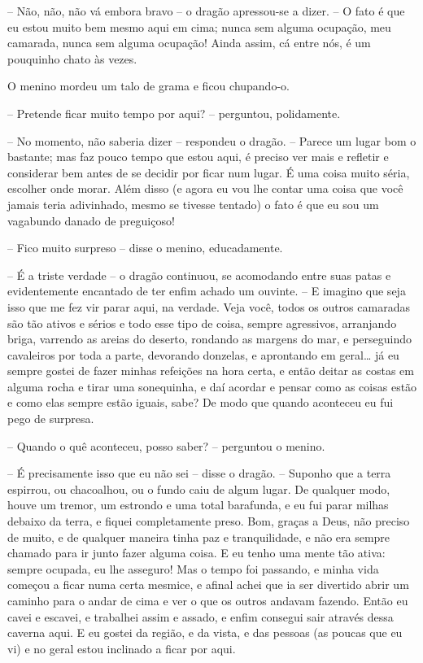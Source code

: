 -- Não, não, não vá embora bravo -- o dragão apressou-se a dizer. -- O
fato é que eu estou muito bem mesmo aqui em cima; nunca sem alguma
ocupação, meu camarada, nunca sem alguma ocupação! Ainda assim, cá
entre nós, é um pouquinho chato às vezes.

O menino mordeu um talo de grama e ficou chupando-o. 

-- Pretende ficar muito tempo por aqui? -- perguntou, polidamente. 

-- No momento, não saberia dizer -- respondeu o dragão. -- Parece um
lugar bom o bastante; mas faz pouco tempo que estou aqui, é preciso
ver mais e refletir e considerar bem antes de se decidir por ficar
num lugar. É uma coisa muito séria, escolher onde morar. Além disso
(e agora eu vou lhe contar uma coisa que você jamais teria
adivinhado, mesmo se tivesse tentado) o fato é que eu sou um
vagabundo danado de preguiçoso!

-- Fico muito surpreso -- disse o menino, educadamente.

-- É a triste verdade -- o dragão continuou, se acomodando entre suas
patas e evidentemente encantado de ter enfim achado um ouvinte. -- E
imagino que seja isso que me fez vir parar aqui, na verdade. Veja
você, todos os outros camaradas são tão ativos e sérios e todo esse
tipo de coisa, sempre agressivos, arranjando briga, varrendo as
areias do deserto, rondando as margens do mar, e perseguindo
cavaleiros por toda a parte, devorando donzelas, e aprontando em
geral… já eu sempre gostei de fazer minhas refeições na hora certa, e
então deitar as costas em alguma rocha e tirar uma sonequinha, e daí
acordar e pensar como as coisas estão e como elas sempre estão
iguais, sabe? De modo que quando aconteceu eu fui pego de surpresa.

-- Quando o quê aconteceu, posso saber? -- perguntou o menino.

-- É precisamente isso que eu não sei -- disse o dragão. -- Suponho que a
terra espirrou, ou chacoalhou, ou o fundo caiu de algum lugar. De
qualquer modo, houve um tremor, um estrondo e uma total barafunda, e
eu fui parar milhas debaixo da terra, e fiquei completamente preso.
Bom, graças a Deus, não preciso de muito, e de qualquer maneira tinha
paz e tranquilidade, e não era sempre chamado para ir junto fazer
alguma coisa. E eu tenho uma mente tão ativa: sempre ocupada, eu lhe
asseguro! Mas o tempo foi passando, e minha vida começou a ficar numa
certa mesmice, e afinal achei que ia ser divertido abrir um caminho
para o andar de cima e ver o que os outros andavam fazendo. Então eu
cavei e escavei, e trabalhei assim e assado, e enfim consegui sair
através dessa caverna aqui. E eu gostei da região, e da vista, e das
pessoas (as poucas que eu vi) e no geral estou inclinado a ficar por
aqui.

